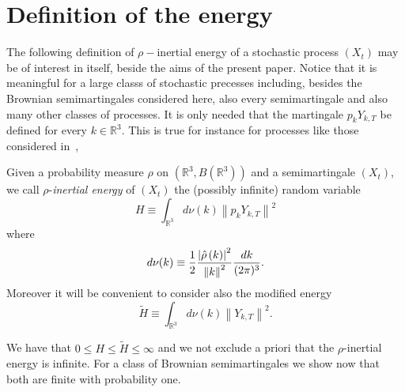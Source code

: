 \section{Definition of the energy}
The following definition of $\rho-$inertial energy of a stochastic
process $(X_t)$ may be of interest in itself, beside the aims of the
present paper. Notice that it is meaningful for a large classs of
stochastic precesses including, besides the Brownian semimartingales
considered here, also every semimartingale and also many other classes
of processes. It is only needed that the martingale
$p_k Y_{k,T}$ be defined for every $k \in \mathbb{R}^3$. 
This is true for instance
for processes like those considered in~\cite{Bert},\cite{Zal}

\begin{definition}
\label{def_energy}
Given a probability measure $\rho $ on $( \mathbb{R}^{3},B( 
\mathbb{R}^{3})) $ and a semimartingale $( X_{t}) $,
we call $\rho $-\textit{inertial energy} of $( X_{t}) $ the
(possibly infinite) random variable 
\begin{equation}
H \equiv \int_{\mathbb{R}^3} d\nu(k) \left\|p_k Y_{k,T}\right\|^2
\label{defH}
\end{equation}
where
$$
d\nu(k) \equiv \frac{1}{2} \frac{\left| \hat{\rho}\left( k\right) \right| ^{2}}
{\left\| k\right\|^{2}} \frac{dk}{(2\pi)^3}.
$$
Moreover it will be convenient to consider also the modified energy
\begin{equation}
\tilde{H} \equiv \int_{\mathbb{R}^3} d\nu(k) \left\| Y_{k,T}\right\|^2.
\label{defHtilde}
\end{equation}
\end{definition}
We have that $0 \le H \le \tilde{H} \le \infty$ and we
not exclude a priori that the $\rho $-inertial energy is infinite. For a
class of Brownian semimartingales we show now that both are finite with
probability one.

